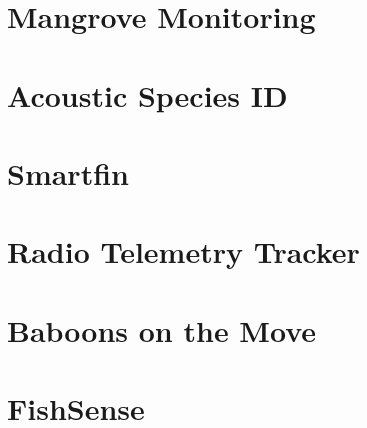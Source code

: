 \section{Mangrove Monitoring}

\section{Acoustic Species ID}

\section{Smartfin}

\section{Radio Telemetry Tracker}

\section{Baboons on the Move}

\section{FishSense}

